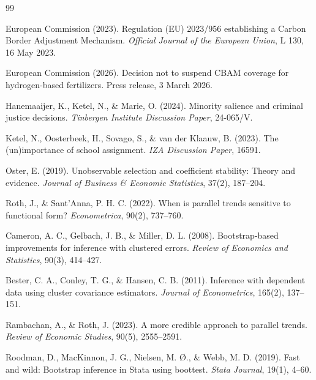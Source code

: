 \documentclass[11pt,a4paper]{article}
\begin{document}
\begin{thebibliography}{99}

European Commission (2023).
\newblock Regulation (EU) 2023/956 establishing a Carbon Border Adjustment Mechanism.
\newblock \textit{Official Journal of the European Union}, L 130, 16 May 2023.

European Commission (2026).
\newblock Decision not to suspend CBAM coverage for hydrogen-based fertilizers.
\newblock Press release, 3 March 2026.

Hanemaaijer, K., Ketel, N., \& Marie, O. (2024).
\newblock Minority salience and criminal justice decisions.
\newblock \textit{Tinbergen Institute Discussion Paper}, 24-065/V.

Ketel, N., Oosterbeek, H., Sovago, S., \& van der Klaauw, B. (2023).
\newblock The (un)importance of school assignment.
\newblock \textit{IZA Discussion Paper}, 16591.

Oster, E. (2019).
\newblock Unobservable selection and coefficient stability: Theory and evidence.
\newblock \textit{Journal of Business \& Economic Statistics}, 37(2), 187--204.

Roth, J., \& Sant'Anna, P. H. C. (2022).
\newblock When is parallel trends sensitive to functional form?
\newblock \textit{Econometrica}, 90(2), 737--760.

Cameron, A. C., Gelbach, J. B., \& Miller, D. L. (2008).
\newblock Bootstrap-based improvements for inference with clustered errors.
\newblock \textit{Review of Economics and Statistics}, 90(3), 414--427.

Bester, C. A., Conley, T. G., \& Hansen, C. B. (2011).
\newblock Inference with dependent data using cluster covariance estimators.
\newblock \textit{Journal of Econometrics}, 165(2), 137--151.

Rambachan, A., \& Roth, J. (2023).
\newblock A more credible approach to parallel trends.
\newblock \textit{Review of Economic Studies}, 90(5), 2555--2591.

Roodman, D., MacKinnon, J. G., Nielsen, M. \O., \& Webb, M. D. (2019).
\newblock Fast and wild: Bootstrap inference in Stata using boottest.
\newblock \textit{Stata Journal}, 19(1), 4--60.


\end{thebibliography}
\end{document}
